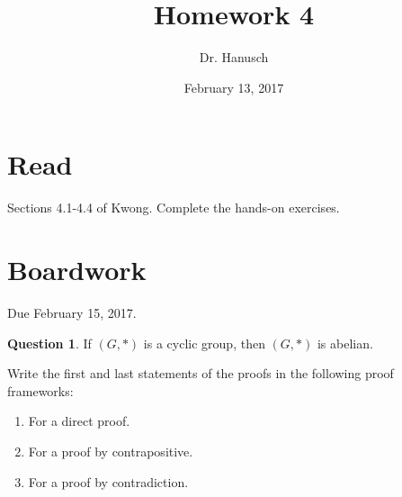 \documentclass[12pt]{article}
\title{Homework 4}
\author{Dr. Hanusch}  %
\date{February 13, 2017}
\begin{document}
\newtheorem{thm}{Theorem}[section]
\newtheorem{cor}[thm]{Corollary}
\newtheorem{lem}[thm]{Lemma}
\newtheorem{prop}[thm]{Proposition}
\theoremstyle{definition}
\newtheorem{defn}[thm]{Definition}
\newtheorem{qu}[]{Question}
\theoremstyle{remark}
\newtheorem{rem}[thm]{Remark}
\newtheorem*{prf}{Proof}

\newcommand{\norm}[1]{\left\Vert#1\right\Vert}
\newcommand{\abs}[1]{\left\vert#1\right\vert}
\newcommand{\set}[1]{\left\{#1\right\}}
\newcommand{\Real}{\mathbb R}
\newcommand{\eps}{\varepsilon}
\newcommand{\To}{\longrightarrow}
\newcommand{\BX}{\mathbf{B}(X)}
\newcommand{\A}{\mathcal{A}}




\maketitle

\section{Read}

Sections 4.1-4.4 of Kwong. Complete the hands-on exercises.

\section{Boardwork} 

Due February 15, 2017.

\begin{qu}
If $(G, \ast)$ is a cyclic group, then $(G, \ast)$ is abelian. 

Write the first and last statements of the proofs in the following proof frameworks:
\begin{enumerate}[label=\alph*)]
\item For a direct proof.
\item For a proof by contrapositive.
\item For a proof by contradiction.
\end{enumerate}
\end{qu}
\end{document}
